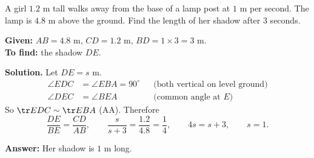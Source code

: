 \begin{example}
A girl $1.2$ m tall walks away from the base of a lamp post at $1$ m per second. The lamp is $4.8$ m above the ground. Find the length of her shadow after $3$ seconds.

\begin{center}\end{center}

\textbf{Given:} $AB=4.8$ m, $CD=1.2$ m, $BD=1\times3=3$ m.\\
\textbf{To find:} the shadow $DE$.

\textbf{Solution.} Let $DE=s$ m.
\[
\begin{aligned}
\angle EDC&=\angle EBA=90^\circ &&\text{(both vertical on level ground)}\\
\angle DEC&=\angle BEA &&\text{(common angle at $E$)}
\end{aligned}
\]
So $\tr EDC\sim\tr EBA$ (AA). Therefore
\[
\dfrac{DE}{BE}=\dfrac{CD}{AB},\qquad \dfrac{s}{s+3}=\dfrac{1.2}{4.8}=\dfrac14,\qquad 4s=s+3,\qquad s=1.
\]

\textbf{Answer:} Her shadow is $1$ m long.
\end{example}


